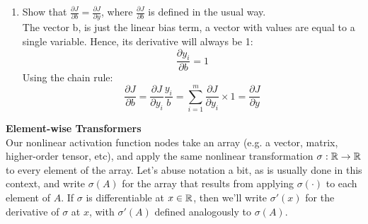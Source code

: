 \documentclass{article}
\newcommand{\nyuparagraph}[1]{\vspace{0.3cm}\textcolor{nyupurple}{\bf \large #1}\\}
\theoremstyle{plain}
\theoremstyle{definition}
\begin{document}
\begin{enumerate}
\item Show that $\frac{\partial J}{\partial b}=\frac{\partial J}{\partial y}$,
where $\frac{\partial J}{\partial b}$ is defined in the usual way.\\

The vector b, is just the linear bias term, a vector with values are equal to a single variable. Hence, its derivative will always be 1:
$$
    \frac{\partial y_i}{\partial b} = 1
$$
Using the chain rule:
$$
    \frac{\partial J}{\partial b}= \frac{\partial J}{\partial y_i} \frac{y_i}{b}=\sum_{i=1}^m \frac{\partial J}{\partial y_{i}} \times 1 = \frac{\partial J}{\partial y}
$$
\setcounter{saveenum}{\value{enumi}}
\end{enumerate}


\nyuparagraph{Element-wise Transformers}

Our nonlinear activation function nodes take an array (e.g. a vector,
matrix, higher-order tensor, etc), and apply the same nonlinear transformation
$\sigma:\mathbb{R}\to\mathbb{R}$ to every element of the array. Let's abuse
notation a bit, as is usually done in this context, and write $\sigma(A)$
for the array that results from applying $\sigma(\cdot)$ to each
element of $A$. If $\sigma$ is differentiable at $x\in\mathbb{R}$,
then we'll write $\sigma'(x)$ for the derivative of $\sigma$ at
$x$, with $\sigma'(A)$ defined analogously to $\sigma(A)$.
\end{document}
